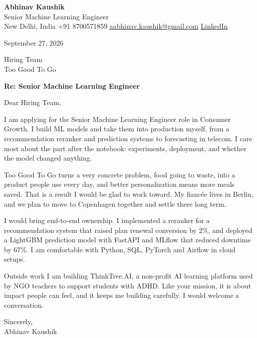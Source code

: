 \documentclass[11pt,a4paper]{article}
\begin{document}
{\Large\bfseries Abhinav Kaushik}\\
Senior Machine Learning Engineer\\
New Delhi, India \textbar{} +91 8700571859 \textbar{} \href{mailto:aabhinav.kaushik@gmail.com}{aabhinav.kaushik@gmail.com} \textbar{} \href{https://www.linkedin.com/in/abhinav-kaushik10/}{LinkedIn}  

September 27, 2026

Hiring Team\\
Too Good To Go

\textbf{Re: Senior Machine Learning Engineer}

Dear Hiring Team,

I am applying for the Senior Machine Learning Engineer role in Consumer Growth. I build ML models and take them into production myself, from a recommendation reranker and prediction systems to forecasting in telecom. I care most about the part after the notebook: experiments, deployment, and whether the model changed anything.

Too Good To Go turns a very concrete problem, food going to waste, into a product people use every day, and better personalization means more meals saved. That is a result I would be glad to work toward. My fiancée lives in Berlin, and we plan to move to Copenhagen together and settle there long term.

I would bring end-to-end ownership. I implemented a reranker for a recommendation system that raised plan renewal conversion by 2\%, and deployed a LightGBM prediction model with FastAPI and MLflow that reduced downtime by 67\%. I am comfortable with Python, SQL, PyTorch and Airflow in cloud setups.

Outside work I am building ThinkTree.AI, a non-profit AI learning platform used by NGO teachers to support students with ADHD. Like your mission, it is about impact people can feel, and it keeps me building carefully. I would welcome a conversation.

Sincerely,\\[4pt]
Abhinav Kaushik
\end{document}
